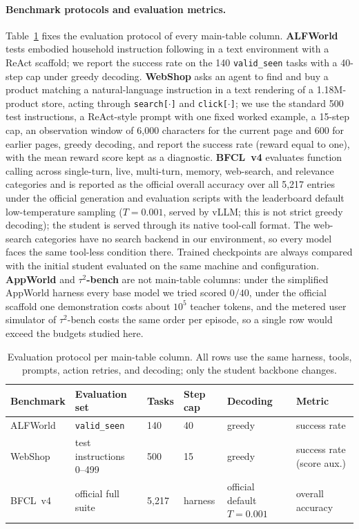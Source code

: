 \paragraph{Benchmark protocols and evaluation metrics.}
Table~\ref{tab:eval-protocol} fixes the evaluation protocol of every
main-table column. \textbf{ALFWorld} tests embodied household
instruction following in a text environment with a ReAct scaffold; we
report the success rate on the 140 \texttt{valid\_seen} tasks with a
40-step cap under greedy decoding. \textbf{WebShop} asks an agent to
find and buy a product matching a natural-language instruction in a
text rendering of a 1.18M-product store, acting through
\texttt{search[$\cdot$]} and \texttt{click[$\cdot$]}; we use the
standard 500 test instructions, a ReAct-style prompt with one fixed
worked example, a 15-step cap, an observation window of 6{,}000
characters for the current page and 600 for earlier pages, greedy
decoding, and report the success
rate (reward equal to one), with the mean reward score kept as a
diagnostic. \textbf{BFCL~v4} evaluates function calling across
single-turn, live, multi-turn, memory, web-search, and relevance
categories and is reported as the official overall accuracy over all
5{,}217 entries under the official generation and evaluation scripts
with the leaderboard default low-temperature sampling ($T=0.001$,
served by vLLM; this is not strict greedy decoding); the student is
served through its native tool-call format. The web-search categories
have no search backend in our environment, so every model faces the
same tool-less condition there. Trained checkpoints are always
compared with the initial student evaluated on the same machine and
configuration. \textbf{AppWorld} and \textbf{$\tau^2$-bench} are not
main-table columns: under the simplified AppWorld harness every base
model we tried scored $0/40$, under the official scaffold one
demonstration costs about $10^5$ teacher tokens, and the metered user
simulator of $\tau^2$-bench costs the same order per episode, so a
single row would exceed the budgets studied here.

\begin{table}[h]
\centering
\caption{Evaluation protocol per main-table column. All rows use the
same harness, tools, prompts, action retries, and decoding; only the
student backbone changes.}
\label{tab:eval-protocol}
\small
\begin{tabular}{llllll}
\toprule
Benchmark & Evaluation set & Tasks & Step cap & Decoding & Metric\\
\midrule
ALFWorld & \texttt{valid\_seen} & 140 & 40 & greedy & success rate\\
WebShop & test instructions 0--499 & 500 & 15 & greedy & success rate (score aux.)\\
BFCL~v4 & official full suite & 5{,}217 & harness & official default $T{=}0.001$ & overall accuracy\\
\bottomrule
\end{tabular}
\end{table}


